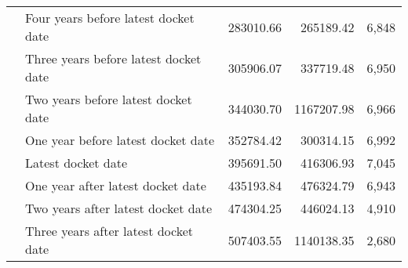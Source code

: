 \begin{tabular}{llrrr}
 & Four years before latest docket date & 283010.66 & 265189.42 & 6,848 \\
 & Three years before latest docket date & 305906.07 & 337719.48 & 6,950 \\
 & Two years before latest docket date & 344030.70 & 1167207.98 & 6,966 \\
 & One year before latest docket date & 352784.42 & 300314.15 & 6,992 \\
 & Latest docket date & 395691.50 & 416306.93 & 7,045 \\
 & One year after latest docket date & 435193.84 & 476324.79 & 6,943 \\
 & Two years after latest docket date & 474304.25 & 446024.13 & 4,910 \\
 & Three years after latest docket date & 507403.55 & 1140138.35 & 2,680 \\
\cline{1-5}
\bottomrule
\end{tabular}
